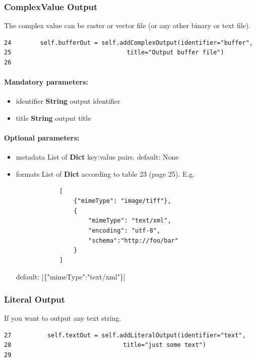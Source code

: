 \documentclass[a4paper,11pt]{report}
\begin{document}
\subsubsection{ComplexValue Output}
The complex value can be raster or vector file (or any other binary or text
file).

\begin{verbatim}
24        self.bufferOut = self.addComplexOutput(identifier="buffer",
25                                title="Output buffer file")
26
\end{verbatim}

\paragraph{Mandatory parameters:}
\begin{itemize}
\item identifier \textbf{String} output identifier
\item title \textbf{String} output title
\end{itemize}

\paragraph{Optional parameters:}
\begin{itemize}
\item metadata List of \textbf{Dict} {key:value} pairs.
        default: None
\item formats List of \textbf{Dict} according to table 23 (page 25). E.g.
        \begin{verbatim}
            [
                {"mimeType": "image/tiff"},
                {
                    "mimeType": "text/xml",
                    "encoding": "utf-8",
                    "schema":"http://foo/bar"
                }
            ]
        \end{verbatim}
        default: [\{"mimeType":"text/xml"\}]
\end{itemize}


\subsubsection{Literal Output}
If you want to output any text string.
\begin{verbatim}
27          self.textOut = self.addLiteralOutput(identifier="text",
28                               title="just some text")
29
\end{verbatim}
\end{document}
